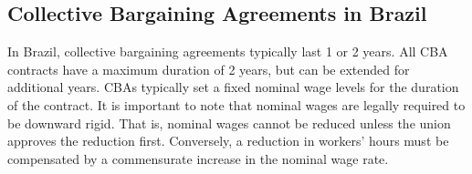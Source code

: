 \documentclass[12pt]{article}
\begin{document}

		\subsection{Collective Bargaining Agreements in Brazil}
		In Brazil, collective bargaining agreements typically last 1 or 2 years. All CBA contracts have a maximum duration of 2 years, but can be extended for additional years. \cite{lagosLaborMarketInstitutions2021} CBAs typically set a fixed nominal wage levels for the duration of the contract. It is important to note that nominal wages are legally required to be downward rigid. That is, nominal wages cannot be reduced unless the union approves the reduction first. Conversely, a reduction in workers' hours must be compensated by a commensurate increase in the nominal wage rate. \cite{EnglishTranslationConsolidation2010}
		
\end{document}
